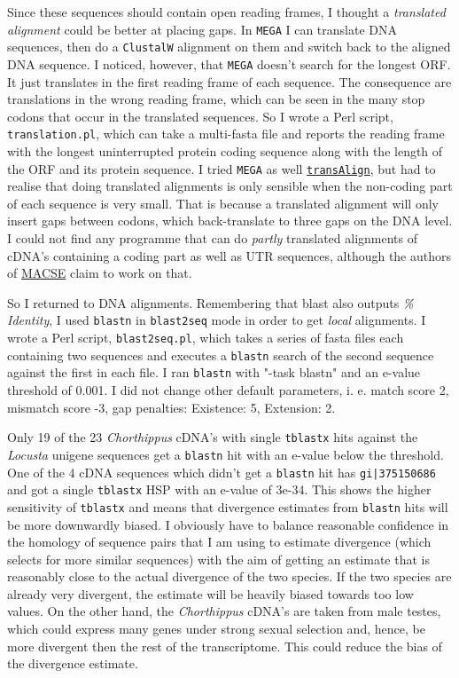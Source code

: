 \documentclass{article}\usepackage[]{graphicx}\usepackage[]{color}
\begin{document}
Since these sequences should contain open reading frames, I thought a \emph{translated alignment} could be better at placing gaps. In \texttt{MEGA} I can translate DNA sequences, then do a \texttt{ClustalW} alignment on them and switch back to the aligned DNA sequence. I noticed, however, that \texttt{MEGA} doesn't search for the longest ORF. It just translates in the first reading frame of each sequence. The consequence are translations in the wrong reading frame, which can be seen in the many stop codons that occur in the translated sequences. So I wrote a Perl script, \texttt{translation.pl}, which can take a multi-fasta file and reports the reading frame with the longest uninterrupted protein coding sequence along with the length of the ORF and its protein sequence.  I tried \texttt{MEGA} as well \href{http://www.biomedcentral.com/1471-2105/6/156/}{\texttt{transAlign}}, but had to realise that doing translated alignments is only sensible when the non-coding part of each sequence is very small. That is because a translated alignment will only insert gaps between codons, which back-translate to three gaps on the DNA level. I could not find any programme that can do \emph{partly} translated alignments of cDNA's containing a coding part as well as UTR sequences, although the authors of \href{http://www.plosone.org/article/info%3Adoi%2F10.1371%2Fjournal.pone.0022594}{MACSE} claim to work on that.

So I returned to DNA alignments. Remembering that blast also outputs \emph{\% Identity}, I used \texttt{blastn} in \texttt{blast2seq} mode in order to get \emph{local} alignments. I wrote a Perl script, \texttt{blast2seq.pl}, which takes a series of fasta files each containing two sequences and executes a \texttt{blastn} search of the second sequence against the first in each file. I ran \texttt{blastn} with "-task blastn" and an e-value threshold of 0.001. I did not change other default parameters, i. e. match score 2, mismatch score -3, gap penalties: Existence: 5, Extension: 2.

Only 19 of the 23 \textit{Chorthippus} cDNA's with single \texttt{tblastx} hits against the \textit{Locusta} unigene sequences get a \texttt{blastn} hit with an e-value below the threshold. One of the 4 cDNA sequences which didn't get a \texttt{blastn} hit has \texttt{gi|375150686} and got a single \texttt{tblastx} HSP with an e-value of 3e-34. This shows the higher sensitivity of \texttt{tblastx} and means that divergence estimates from \texttt{blastn} hits will be more downwardly biased. I obviously have to balance reasonable confidence in the homology of sequence pairs that I am using to estimate divergence (which selects for more similar sequences) with the aim of getting an estimate that is reasonably close to the actual divergence of the two species. If the two species are already very divergent, the estimate will be heavily biased towards too low values. On the other hand, the \textit{Chorthippus} cDNA's are taken from male testes, which could express many genes under strong sexual selection and, hence, be more divergent then the rest of the transcriptome. This could reduce the bias of the divergence estimate.
\end{document}
